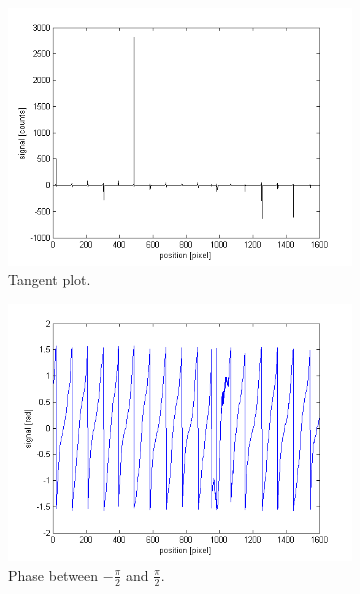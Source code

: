 \documentclass[a4paper, 12pt]{paper}
\begin{document}
\begin{figure}[H]
\begin{subfigure}[t]{0.45\textwidth}
        \includegraphics[width=\textwidth]{img/tangent}
        \caption{Tangent plot.}
    \end{subfigure}
    \begin{subfigure}[t]{0.45\textwidth}
        \includegraphics[width=\textwidth]{img/phase}
        \caption{Phase between $-\frac{\pi}{2}$ and $\frac{\pi}{2}$.}
    \end{subfigure}
    \begin{subfigure}[t]{0.45\textwidth}

\end{subfigure}
\end{figure}
\end{document}
